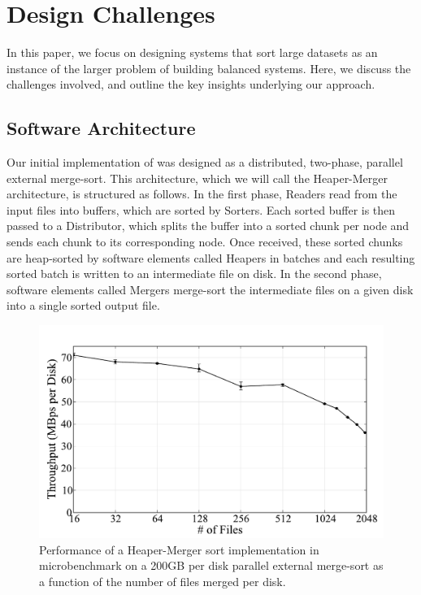 \section{Design Challenges}
\label{sec:challenges}

In this paper, we focus on designing systems that sort large datasets as an
instance of the larger problem of building balanced systems.  Here, we discuss
the challenges involved, and outline the key insights underlying our approach.

\subsection{Software Architecture}

Our initial implementation of \tritonsort was designed as a distributed,
two-phase, parallel external merge-sort.  This architecture, which we will call
the Heaper-Merger architecture, is structured as follows.  In the first phase,
Readers read from the input files into buffers, which are sorted by Sorters.
Each sorted buffer is then passed to a Distributor, which splits the buffer
into a sorted chunk per node and sends each chunk to its corresponding node.
Once received, these sorted chunks are heap-sorted by software elements called
Heapers in batches and each resulting sorted batch is written to an
intermediate file on disk.  In the second phase, software elements called
Mergers merge-sort the intermediate files on a given disk into a single sorted
output file.

\begin{figure}
 \centering
 \includegraphics[width=\textwidth]{tritonsort/graphs/mergesortbench.pdf}

 \caption{Performance of a Heaper-Merger sort
   implementation in microbenchmark on a 200GB per disk parallel external merge-sort as a function of the number of files merged per disk.}
 \label{fig:mergesort}
\end{figure}


